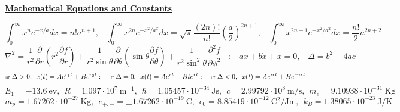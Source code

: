 \documentclass[10pt]{article}
\begin{document}
\begin{center}
\underline{\textbf{Mathematical Equations and Constants}}
\end{center}
\begin{equation*}
\int_{0}^{\infty}x^ne^{-x/a}dx=n!a^{n+1},
\hspace{10pt}
\int_{0}^{\infty}x^{2n}e^{-x^2/a^x}dx=\sqrt{\pi}\frac{(2n)!}{n!}\left(\frac{a}{2}\right)^{2n+1},
\hspace{10pt}
\int_{0}^{\infty}x^{2n+1}e^{-x^2/a^2}dx=\frac{n!}{2}a^{2n+2}
\end{equation*}
\begin{equation*}
\nabla^2=\frac{1}{r^2}\frac{\partial}{\partial r}\left(r^2\frac{\partial f}{\partial r}\right)+\frac{1}{r^2\sin{\theta}}\frac{\partial}{\partial \theta}\left(\sin{\theta}\frac{\partial f}{\partial \theta}\right)+\frac{1}{r^2\sin^2{\theta}}\frac{\partial^2 f}{\partial \phi^2}
\hspace{10pt}:\hspace{10pt}
a\ddot{x}+b\dot{x}+x=0, \hspace{10pt} \Delta=b^2-4ac
\end{equation*}
\begin{equation*}
\text{\tiny iff} \ \Delta>0, \hspace{5pt} x(t)=Ae^{r_1t}+Be^{r_2t}: \hspace{10pt}
\text{\tiny iff} \ \Delta=0, \hspace{5pt} x(t)=Ae^{rt}+Bte^{rt}: \hspace{10pt}
\text{\tiny iff} \ \Delta<0, \hspace{5pt} x(t)=Ae^{irt}+Be^{-irt}
\end{equation*}
\begin{equation*}
E_1=-13.6 \ \text{ev}, \hspace{5pt}
R=1.097\cdot10^7 \ \text{m$^{-1}$}, \hspace{5pt}
\hbar=1.05457\cdot10^{-34} \ \text{Js}, \hspace{5pt}
c=2.99792\cdot10^8 \ \text{m/s}, \hspace{5pt}
m_e=9.10938\cdot10^{-31} \ \text{Kg}
\end{equation*}
\begin{equation*}
m_p=1.67262\cdot10^{-27} \ \text{Kg}, \hspace{5pt}
e_{+,-}=\pm1.67262\cdot10^{-19} \ \text{C}, \hspace{5pt}
\epsilon_{0}=8.85419\cdot10^{-12} \ \text{C$^2$/Jm}, \hspace{5pt}
k_{B}=1.38065\cdot10^{-23} \ \text{J/K}
\end{equation*}
\end{document}
